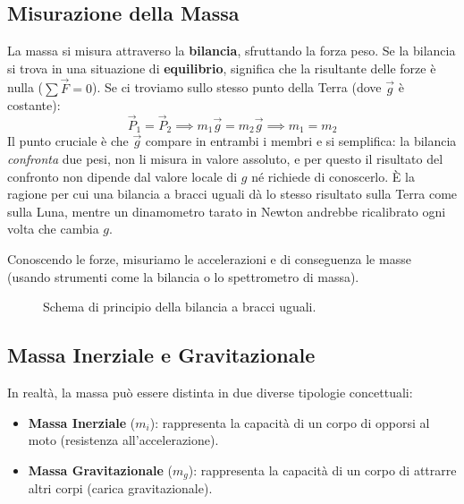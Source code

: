 \subsection{Misurazione della Massa}
La massa si misura attraverso la \textbf{bilancia}, sfruttando la forza peso. Se la bilancia si trova in una situazione di \textbf{equilibrio}, significa che la risultante delle forze è nulla ($\sum \vec{F} = 0$).
Se ci troviamo sullo stesso punto della Terra (dove $\vec{g}$ è costante):
\begin{equation}
    \vec{P}_1 = \vec{P}_2 \implies m_1 \vec{g} = m_2 \vec{g} \implies m_1 = m_2
\end{equation}
Il punto cruciale è che $\vec{g}$ compare in entrambi i membri e si semplifica: la bilancia \emph{confronta} due pesi, non li misura in valore assoluto, e per questo il risultato del confronto non dipende dal valore locale di $g$ né richiede di conoscerlo. È la ragione per cui una bilancia a bracci uguali dà lo stesso risultato sulla Terra come sulla Luna, mentre un dinamometro tarato in Newton andrebbe ricalibrato ogni volta che cambia $g$.

Conoscendo le forze, misuriamo le accelerazioni e di conseguenza le masse (usando strumenti come la bilancia o lo spettrometro di massa).

\begin{figure}[h!]
    \centering
    \caption{Schema di principio della bilancia a bracci uguali.}
    \label{fig:bilancia_schema}
\end{figure}

\subsection{Massa Inerziale e Gravitazionale}
In realtà, la massa può essere distinta in due diverse tipologie concettuali:
\begin{itemize}
    \item \textbf{Massa Inerziale} ($m_i$): rappresenta la capacità di un corpo di opporsi al moto (resistenza all'accelerazione).
    \item \textbf{Massa Gravitazionale} ($m_g$): rappresenta la capacità di un corpo di attrarre altri corpi (carica gravitazionale).
\end{itemize}

